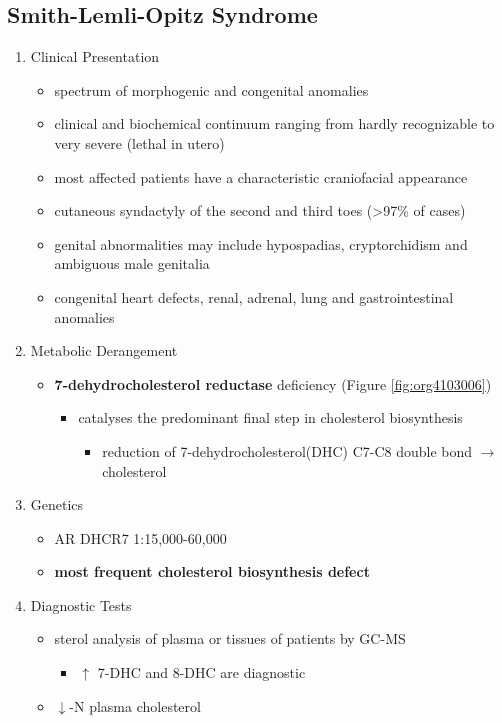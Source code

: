 \documentclass{scrartcl}
\begin{document}
\subsection{Smith-Lemli-Opitz Syndrome}
\label{sec:org48c24a0}
\begin{enumerate}
\item Clinical Presentation
\label{sec:org889e920}
\begin{itemize}
\item spectrum of morphogenic and congenital anomalies
\item clinical and biochemical continuum ranging from hardly recognizable
to very severe (lethal in utero)
\item most affected patients have a characteristic craniofacial appearance
\item cutaneous syndactyly of the second and third toes (>97\% of cases)
\item genital abnormalities may include hypospadias, cryptorchidism and
ambiguous male genitalia
\item congenital heart defects, renal, adrenal, lung and gastrointestinal
anomalies
\end{itemize}

\item Metabolic Derangement
\label{sec:org525ff19}
\begin{itemize}
\item \textbf{7-dehydrocholesterol reductase} deficiency (Figure \ref{fig:org4103006})
\begin{itemize}
\item catalyses the predominant final step in cholesterol biosynthesis
\begin{itemize}
\item reduction of 7-dehydrocholesterol(DHC) C7-C8 double bond \(\to\) cholesterol
\end{itemize}
\end{itemize}
\end{itemize}

\item Genetics
\label{sec:org974bf92}
\begin{itemize}
\item AR DHCR7 1:15,000-60,000
\item \textbf{most frequent cholesterol biosynthesis defect}
\end{itemize}

\item Diagnostic Tests
\label{sec:org0ff728e}
\begin{itemize}
\item sterol analysis of plasma or tissues of patients by GC-MS
\begin{itemize}
\item \(\uparrow\) 7-DHC and 8-DHC are diagnostic
\end{itemize}
\item \(\downarrow\)-N plasma cholesterol
\end{itemize}


\end{enumerate}
\end{document}
